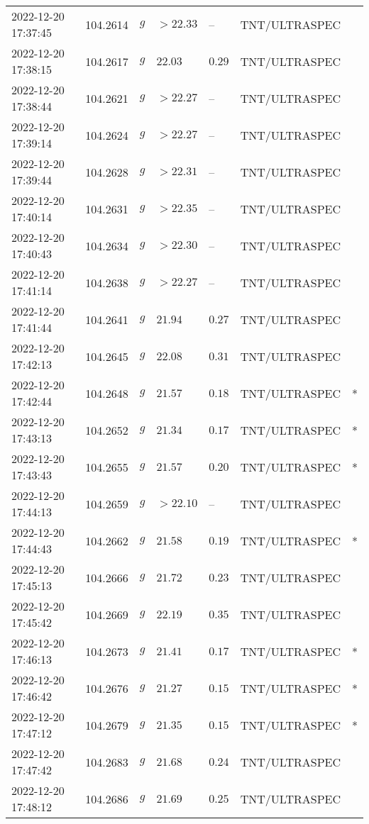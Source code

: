 \documentclass{nature_plusfigure}
\begin{document}
\begin{supplement}
\begin{center}
\begin{longtable}{lllllll}
2022-12-20 17:37:45 & 104.2614 & $g$ & $>22.33$ & -- & TNT/ULTRASPEC &  \\ 
2022-12-20 17:38:15 & 104.2617 & $g$ & $22.03$ & $0.29$ & TNT/ULTRASPEC &  \\ 
2022-12-20 17:38:44 & 104.2621 & $g$ & $>22.27$ & -- & TNT/ULTRASPEC &  \\ 
2022-12-20 17:39:14 & 104.2624 & $g$ & $>22.27$ & -- & TNT/ULTRASPEC &  \\ 
2022-12-20 17:39:44 & 104.2628 & $g$ & $>22.31$ & -- & TNT/ULTRASPEC &  \\ 
2022-12-20 17:40:14 & 104.2631 & $g$ & $>22.35$ & -- & TNT/ULTRASPEC &  \\ 
2022-12-20 17:40:43 & 104.2634 & $g$ & $>22.30$ & -- & TNT/ULTRASPEC &  \\ 
2022-12-20 17:41:14 & 104.2638 & $g$ & $>22.27$ & -- & TNT/ULTRASPEC &  \\ 
2022-12-20 17:41:44 & 104.2641 & $g$ & $21.94$ & $0.27$ & TNT/ULTRASPEC &  \\ 
2022-12-20 17:42:13 & 104.2645 & $g$ & $22.08$ & $0.31$ & TNT/ULTRASPEC &  \\ 
2022-12-20 17:42:44 & 104.2648 & $g$ & $21.57$ & $0.18$ & TNT/ULTRASPEC & * \\ 
2022-12-20 17:43:13 & 104.2652 & $g$ & $21.34$ & $0.17$ & TNT/ULTRASPEC & * \\ 
2022-12-20 17:43:43 & 104.2655 & $g$ & $21.57$ & $0.20$ & TNT/ULTRASPEC & * \\ 
2022-12-20 17:44:13 & 104.2659 & $g$ & $>22.10$ & -- & TNT/ULTRASPEC &  \\ 
2022-12-20 17:44:43 & 104.2662 & $g$ & $21.58$ & $0.19$ & TNT/ULTRASPEC & * \\ 
2022-12-20 17:45:13 & 104.2666 & $g$ & $21.72$ & $0.23$ & TNT/ULTRASPEC &  \\ 
2022-12-20 17:45:42 & 104.2669 & $g$ & $22.19$ & $0.35$ & TNT/ULTRASPEC &  \\ 
2022-12-20 17:46:13 & 104.2673 & $g$ & $21.41$ & $0.17$ & TNT/ULTRASPEC & * \\ 
2022-12-20 17:46:42 & 104.2676 & $g$ & $21.27$ & $0.15$ & TNT/ULTRASPEC & * \\ 
2022-12-20 17:47:12 & 104.2679 & $g$ & $21.35$ & $0.15$ & TNT/ULTRASPEC & * \\ 
2022-12-20 17:47:42 & 104.2683 & $g$ & $21.68$ & $0.24$ & TNT/ULTRASPEC &  \\ 
2022-12-20 17:48:12 & 104.2686 & $g$ & $21.69$ & $0.25$ & TNT/ULTRASPEC &  \\ 

\end{longtable}
\end{center}
\end{supplement}
\end{document}
